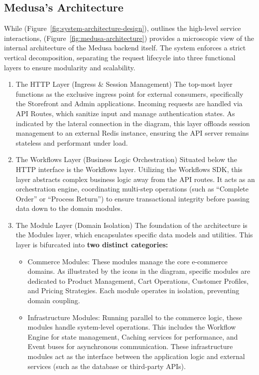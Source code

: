 \subsection{Medusa's Architecture}
While (Figure~\ref{fig:system-architecture-design}), outlines the high-level service interactions,  (Figure~\ref{fig:medusa-architecture}) provides a microscopic view of the internal architecture of the Medusa backend itself. The system enforces a strict vertical decomposition, separating the request lifecycle into three functional layers to ensure modularity and scalability.
\begin{enumerate}
    \item The HTTP Layer (Ingress \& Session Management) The top-most layer functions as the exclusive ingress point for external consumers, specifically the Storefront and Admin applications. Incoming requests are handled via API Routes, which sanitize input and manage authentication states. As indicated by the lateral connection in the diagram, this layer offloads session management to an external Redis instance, ensuring the API server remains stateless and performant under load.
    \item The Workflows Layer (Business Logic Orchestration) Situated below the HTTP interface is the Workflows layer. Utilizing the Workflows SDK, this layer abstracts complex business logic away from the API routes. It acts as an orchestration engine, coordinating multi-step operations (such as ``Complete Order'' or ``Process Return'') to ensure transactional integrity before passing data down to the domain modules.
    \item The Module Layer (Domain Isolation) The foundation of the architecture is the Modules layer, which encapsulates specific data models and utilities. This layer is bifurcated into\textbf{ two distinct categories:}
    \begin{itemize}
        \item Commerce Modules: These modules manage the core e-commerce domains. As illustrated by the icons in the diagram, specific modules are dedicated to Product Management, Cart Operations, Customer Profiles, and Pricing Strategies. Each module operates in isolation, preventing domain coupling.
        \item Infrastructure Modules: Running parallel to the commerce logic, these modules handle system-level operations. This includes the Workflow Engine for state management, Caching services for performance, and Event buses for asynchronous communication. These infrastructure modules act as the interface between the application logic and external services (such as the database or third-party APIs).
    \end{itemize}
\end{enumerate}
